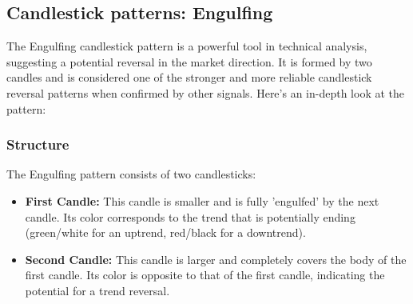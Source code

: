 \documentclass{report}
\begin{document}
     \bigbreak \noindent 
     \subsection{Candlestick patterns: Engulfing}
     \bigbreak \noindent 
     \bigbreak \noindent 
    The Engulfing candlestick pattern is a powerful tool in technical analysis, suggesting a potential reversal in the market direction. It is formed by two candles and is considered one of the stronger and more reliable candlestick reversal patterns when confirmed by other signals. Here's an in-depth look at the pattern:

    \bigbreak \noindent 
    \subsubsection{Structure}
    \bigbreak \noindent 
    The Engulfing pattern consists of two candlesticks:
    \begin{itemize}
        \item \textbf{First Candle:} This candle is smaller and is fully 'engulfed' by the next candle. Its color corresponds to the trend that is potentially ending (green/white for an uptrend, red/black for a downtrend).
        \item \textbf{Second Candle:} This candle is larger and completely covers the body of the first candle. Its color is opposite to that of the first candle, indicating the potential for a trend reversal.
    \end{itemize}

    \bigbreak \noindent 
\end{document}

